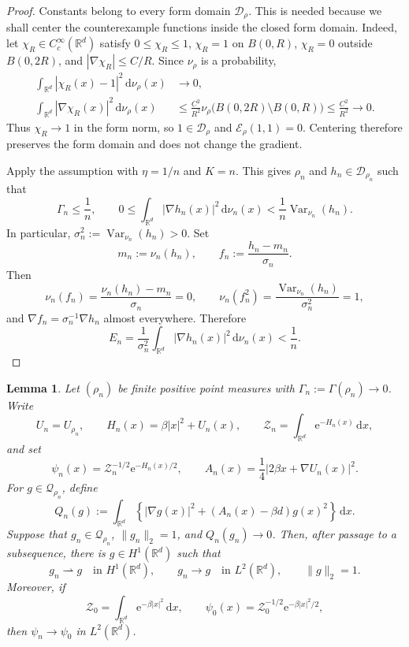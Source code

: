 \documentclass[12pt,reqno,letterpaper]{amsart}
\newtheorem{lemma}[theorem]{Lemma}
\theoremstyle{definition}
\theoremstyle{remark}
\numberwithin{equation}{section}
\newcommand{\R}{\mathbb R}
\newcommand{\dd}{\,\mathrm d}
\newcommand{\ee}{\mathrm e}
\newcommand{\be}{\beta}
\newcommand{\cE}{\mathcal E}
\newcommand{\cD}{\mathcal D}
\newcommand{\Var}{\operatorname{Var}}
\begin{document}
\begin{proof}
Constants belong to every form domain \(\cD_\rho\).  This is needed because
we shall center the counterexample functions inside the closed form domain.
Indeed, let
\(\chi_R\in C_c^\infty(\R^d)\) satisfy \(0\le\chi_R\le1\),
\(\chi_R=1\) on \(B(0,R)\), \(\chi_R=0\) outside \(B(0,2R)\), and
\(|\nabla\chi_R|\le C/R\).  Since \(\nu_\rho\) is a probability,
\begin{align*}
 \int_{\R^d}|\chi_R(x)-1|^2\dd\nu_\rho(x)&\longrightarrow0,\\
 \int_{\R^d}|\nabla\chi_R(x)|^2\dd\nu_\rho(x)
 &\le\frac{C^2}{R^2}
 \nu_\rho\bigl(B(0,2R)\setminus B(0,R)\bigr)
 \le\frac{C^2}{R^2}\longrightarrow0.
\end{align*}
Thus \(\chi_R\to1\) in the form norm, so \(1\in\cD_\rho\) and
\(\cE_\rho(1,1)=0\).  Centering therefore preserves the form domain and
does not change the gradient.

Apply the assumption with \(\eta=1/n\) and \(K=n\).  This gives
\(\rho_n\) and \(h_n\in\cD_{\rho_n}\) such that
\[
 \Gamma_n\le\frac1n,
 \qquad
 0\le\int_{\R^d}|\nabla h_n(x)|^2\dd\nu_n(x)
 <\frac1n\Var_{\nu_n}(h_n).
\]
In particular, \(\sigma_n^2:=\Var_{\nu_n}(h_n)>0\).  Set
\[
 m_n:=\nu_n(h_n),
 \qquad
 f_n:=\frac{h_n-m_n}{\sigma_n}.
\]
Then
\[
 \nu_n(f_n)=\frac{\nu_n(h_n)-m_n}{\sigma_n}=0,
 \qquad
 \nu_n(f_n^2)=\frac{\Var_{\nu_n}(h_n)}{\sigma_n^2}=1,
\]
and \(\nabla f_n=\sigma_n^{-1}\nabla h_n\) almost everywhere.  Therefore
\[
 E_n
 =\frac1{\sigma_n^2}
 \int_{\R^d}|\nabla h_n(x)|^2\dd\nu_n(x)
 <\frac1n.
\]
\end{proof}

\begin{lemma}
\label{lem:transformed-compactness}
Let \((\rho_n)\) be finite positive point measures with
\(\Gamma_n:=\Gamma(\rho_n)\to0\).  Write
\[
 U_n=U_{\rho_n},\qquad
 H_n(x)=\be|x|^2+U_n(x),\qquad
 \mathcal Z_n=\int_{\R^d}\ee^{-H_n(x)}\dd x,
\]
and set
\[
 \psi_n(x)=\mathcal Z_n^{-1/2}\ee^{-H_n(x)/2},
 \qquad
 A_n(x)=\frac14|2\be x+\nabla U_n(x)|^2.
\]
For \(g\in\mathcal Q_{\rho_n}\), define
\begin{equation}\label{eq:ground-state-form}
 Q_n(g):=\int_{\R^d}\left\{|\nabla g(x)|^2+
 (A_n(x)-\be d)g(x)^2\right\}\dd x.
\end{equation}
Suppose that \(g_n\in\mathcal Q_{\rho_n}\), \(\|g_n\|_2=1\), and
\(Q_n(g_n)\to0\).  Then, after passage to a subsequence, there is
\(g\in H^1(\R^d)\) such that
\[
 g_n\rightharpoonup g\quad\text{in }H^1(\R^d),
 \qquad
 g_n\longrightarrow g\quad\text{in }L^2(\R^d),
 \qquad
 \|g\|_2=1.
\]
Moreover, if
\[
 \mathcal Z_0=\int_{\R^d}\ee^{-\be|x|^2}\dd x,
 \qquad
 \psi_0(x)=\mathcal Z_0^{-1/2}\ee^{-\be|x|^2/2},
\]
then \(\psi_n\to\psi_0\) in \(L^2(\R^d)\).
\end{lemma}
\end{document}
